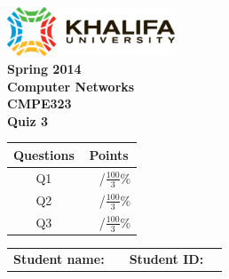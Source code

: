 \documentclass[pdftex,12pt,a4paper]{article}
\begin{document}
    \begin{titlepage}
        \begin{center}
            \includegraphics[width=5cm]{figures/kulogo}\\[1cm]
            {\large \bfseries
                Spring 2014\\
                Computer Networks\\
                CMPE323\\[1cm]
            }
            {\large \bfseries
                \noindent Quiz 3\\[1cm]
            }
        \end{center}

        \begin{center}
            \begin{tabular}{|c|p{1cm}l|}\hline
                \textbf{Questions} & \multicolumn{2}{|c|}{\textbf{Points}} \\\hline
                Q1                &    &    /$\frac{100}{3}$\%   \\\hline
                Q2                &    &    /$\frac{100}{3}$\%   \\\hline
                Q3                &    &    /$\frac{100}{3}$\%   \\\hline
            \end{tabular}
        \end{center}

        \vfill
        \begin{tabular}{lp{5cm}ll}
            \textbf{Student name:} & & \textbf{Student ID:} & \\
        \end{tabular}


    \end{titlepage}
    \newpage

    \section{}
\end{document}
